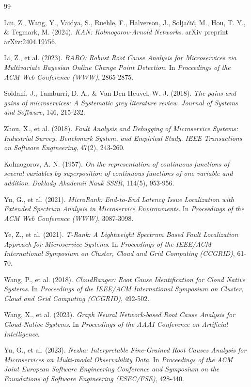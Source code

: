 \documentclass[conference]{IEEEtran}
\begin{document}
\begin{thebibliography}{99}
\small

Liu, Z., Wang, Y., Vaidya, S., Ruehle, F., Halverson, J., Soljačić, M., Hou, T. Y., \& Tegmark, M. (2024).
\textit{KAN: Kolmogorov-Arnold Networks}.
arXiv preprint arXiv:2404.19756.

Li, Z., et al. (2023).
\textit{BARO: Robust Root Cause Analysis for Microservices via Multivariate Bayesian Online Change Point Detection}.
In \textit{Proceedings of the ACM Web Conference (WWW)}, 2865-2875.

Soldani, J., Tamburri, D. A., \& Van Den Heuvel, W. J. (2018).
\textit{The pains and gains of microservices: A Systematic grey literature review}.
\textit{Journal of Systems and Software}, 146, 215-232.

Zhou, X., et al. (2018).
\textit{Fault Analysis and Debugging of Microservice Systems: Industrial Survey, Benchmark System, and Empirical Study}.
\textit{IEEE Transactions on Software Engineering}, 47(2), 243-260.

Kolmogorov, A. N. (1957).
\textit{On the representation of continuous functions of several variables by superposition of continuous functions of one variable and addition}.
\textit{Doklady Akademii Nauk SSSR}, 114(5), 953-956.

Yu, G., et al. (2021).
\textit{MicroRank: End-to-End Latency Issue Localization with Extended Spectrum Analysis in Microservice Environments}.
In \textit{Proceedings of the ACM Web Conference (WWW)}, 3087-3098.

Ye, Z., et al. (2021).
\textit{T-Rank: A Lightweight Spectrum Based Fault Localization Approach for Microservice Systems}.
In \textit{Proceedings of the IEEE/ACM International Symposium on Cluster, Cloud and Grid Computing (CCGRID)}, 61-70.

Wang, P., et al. (2018).
\textit{CloudRanger: Root Cause Identification for Cloud Native Systems}.
In \textit{Proceedings of the IEEE/ACM International Symposium on Cluster, Cloud and Grid Computing (CCGRID)}, 492-502.

Wang, X., et al. (2023).
\textit{Graph Neural Network-based Root Cause Analysis for Cloud-Native Systems}.
In \textit{Proceedings of the AAAI Conference on Artificial Intelligence}.

Yu, G., et al. (2023).
\textit{Nezha: Interpretable Fine-Grained Root Causes Analysis for Microservices on Multi-modal Observability Data}.
In \textit{Proceedings of the ACM Joint European Software Engineering Conference and Symposium on the Foundations of Software Engineering (ESEC/FSE)}, 428-440.


\end{thebibliography}
\end{document}
